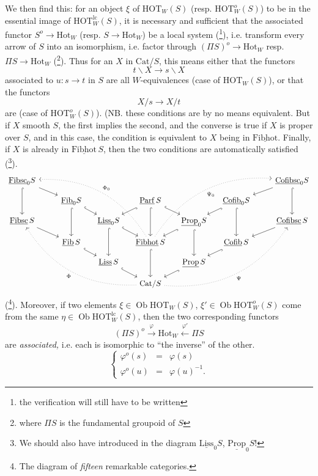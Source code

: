 \documentclass[11pt]{article}
\newcommand{\printedpage}[1]{\marginpar{\footnotesize p.~#1}}
\newcommand{\msp}[1]{\marginpar{\footnotesize [#1]}}
\newcommand{\HOT}{\mathrm{HOT}}
\newcommand{\Cat}{\mathrm{Cat}}
\newcommand{\Hot}{\mathrm{Hot}}
\newcommand{\Ob}{\operatorname{Ob}}
\newcommand{\ul}[1]{\underline{\mathrm{#1}}}
\begin{document}
We then find this: for an object $\xi$ of $\HOT_W(S)$ (resp. $\HOT^o_W(S)$) to be in the essential image of $\HOT^{\mathrm{lc}}_W(S)$, it is necessary and sufficient that the associated functor $S^o\longrightarrow\Hot_W$ (resp. $S\longrightarrow\Hot_W$) be a local system (\footnote{the verification will still have to be written}), i.e. transform every arrow of $S$ into an isomorphism, i.e. factor through $(\Pi S)^o\longrightarrow\Hot_W$ resp. $\Pi S\longrightarrow\Hot_W$ (\footnote{where $\Pi S$ is the fundamental groupoid of $S$}). Thus for an $X$ in $\Cat/S$, this means either that the functors
\[ t\backslash X\longrightarrow s\backslash X \]
associated to $u : s\longrightarrow t$ in $S$ are all $W$-equivalences (case of $\HOT_W(S)$), or that the functors
\[ X/s\longrightarrow X/t \]
are (case of $\HOT^o_W(S)$). (NB. these conditions are by no means equivalent. But if $X$ smooth $S$,
\msp{page 75}
the first implies the second, and the converse is true if $X$ is proper over $S$, and in this case, the condition is equivalent to $X$ being in $\ul{Fibhot}$. Finally, if $X$ is already in $\ul{Fibhot}\,S$, then the two conditions are automatically satisfied (\footnote{We should also have introduced in the diagram $\ul{Liss}_0S$, $\ul{Prop}_0S$!}).
\[
\begin{tikzcd}[column sep=small, row sep=small]
\ul{Fibsc}_0S \arrow[dd,hook] \arrow[drr] & & & & & & & & \ul{Cofibsc}_0S \arrow[dll] \arrow[dd,hook] \\
 & & \ul{Fib}_0S \arrow[dd,hook] \arrow[dr,hook] & & \ul{Parf}\,S \arrow[dl,hook] \arrow[dd,hook] \arrow[dr,hook] & & \ul{Cofib}_0S \arrow[dl,hook] \arrow[dd,hook] & & \\
\ul{Fibsc}\,S \arrow[drr] & & & \ul{Liss}_0S \arrow[dr,hook] \arrow[dd,hook] & & \ul{Prop}_0S \arrow[dl,hook] \arrow[dd,hook] & & & \ul{Cofibsc}\,S \arrow[dll] \\
 & & \ul{Fib}\,S \arrow[dr,hook] & & \ul{Fibhot}\,S \arrow[dd,hook] \arrow[uuullll,dotted,bend right,"\Phi_0"'] \arrow[uuurrrr,dotted,bend left,"\Psi_0"'] & & \ul{Cofib}\,S \arrow[dl,hook] & & \\
 & & & \ul{Liss}\,S \arrow[dr,hook] & & \ul{Prop}\,S \arrow[dl,hook] & & & \\
 & & & & \Cat/S \arrow[uuullll,dotted,bend left,"\Phi"] \arrow[uuurrrr,dotted,bend right,"\Psi"'] & & & &
\end{tikzcd}
\]
\printedpage{47}
(\footnote{The diagram of \textit{fifteen} remarkable categories.}). Moreover, if two elements $\xi\in\Ob\HOT_W(S)$, $\xi'\in\Ob\HOT^o_W(S)$ come from the same $\eta\in\Ob\HOT^{\mathrm{lc}}_W(S)$, then the two corresponding functors
\[ (\Pi S)^o\xrightarrow{\ \varphi\ }\Hot_W\xleftarrow{\ \varphi'\ }\Pi S \]
are \textit{associated,} i.e. each is isomorphic to ``the inverse'' of the other.
\[
\left\{
\begin{array}{lcl}
\varphi^o(s) & = & \varphi(s)\\
\varphi^o(u) & = & \varphi(u)^{-1}.
\end{array}
\right.
\]
\end{document}
